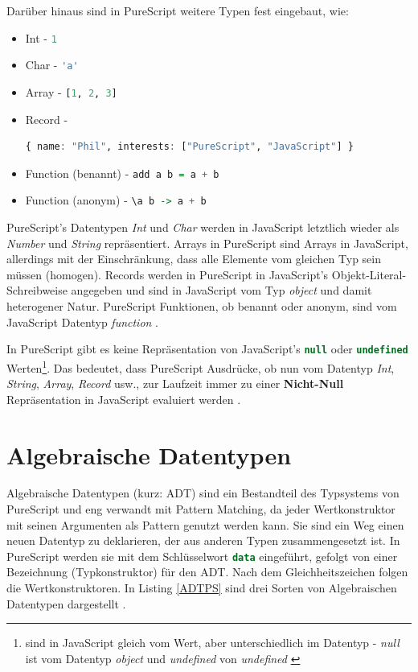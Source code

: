 \documentclass[
12pt,
ngerman,
oneside]
{scrbook} %
\begin{document}
Darüber hinaus sind in PureScript weitere Typen fest eingebaut, wie: 
\begin{itemize}
	\item Int - \lstinline[language=purescript, columns=fixed]{1}
	\item Char - \lstinline[language=purescript, columns=fixed]{'a'}
	\item Array - \lstinline[language=purescript, columns=fixed]{[1, 2, 3]}
	\item Record -  
	\begin{lstlisting}[language=purescript]
		{ name: "Phil", interests: ["PureScript", "JavaScript"] }
	\end{lstlisting}
	\vspace{-1.8em}
	\item Function (benannt) - \lstinline[language=purescript, columns=fixed]{add a b = a + b}
	\item Function (anonym) - \lstinline[language=purescript, columns=fixed]{\a b -> a + b}
\end{itemize}
PureScript's Datentypen \emph{Int} und \emph{Char} werden in JavaScript letztlich wieder als \emph{Number} und \emph{String} repräsentiert. Arrays in PureScript sind Arrays in JavaScript, allerdings mit der Einschränkung, dass alle Elemente vom gleichen Typ sein müssen (homogen). Records werden in PureScript in JavaScript's Objekt-Literal-Schreibweise angegeben und sind in JavaScript vom Typ \emph{object} und damit heterogener Natur.
PureScript Funktionen, ob benannt oder anonym, sind vom JavaScript Datentyp \emph{function} \cite[][S. 16--18, 145]{Freeman17}.

In PureScript gibt es keine Repräsentation von JavaScript's \lstinline[language=javascript, columns=fixed]{null} oder \lstinline[language=javascript, columns=fixed]{undefined} Werten\footnote{sind in JavaScript gleich vom Wert, aber unterschiedlich im Datentyp -  \emph{null} ist vom Datentyp \emph{object} und \emph{undefined} von \emph{undefined}  \cite{w3schoolsJSDatatypes18}}. Das bedeutet, dass PureScript Ausdrücke, ob nun vom Datentyp \emph{Int}, \emph{String}, \emph{Array}, \emph{Record} usw., zur Laufzeit immer zu einer \textbf{Nicht-Null} Repräsentation in JavaScript evaluiert werden \cite[][S. 145]{Freeman17}.

\section{Algebraische Datentypen}
\label{sec:ADT}
Algebraische Datentypen (kurz: ADT) sind ein Bestandteil des Typsystems von PureScript und eng verwandt mit Pattern Matching, da jeder Wertkonstruktor mit seinen Argumenten als Pattern genutzt werden kann. Sie sind ein Weg einen neuen Datentyp zu deklarieren, der aus anderen Typen zusammengesetzt ist. In PureScript werden sie mit dem Schlüsselwort \lstinline[language=purescript, columns=fixed]{data} eingeführt, gefolgt von einer Bezeichnung (Typkonstruktor) für den ADT. Nach dem Gleichheitszeichen folgen die Wertkonstruktoren. In Listing \ref{ADTPS} sind drei Sorten von Algebraischen Datentypen dargestellt \cite[][S. 57--59]{Freeman17}.
\end{document}

